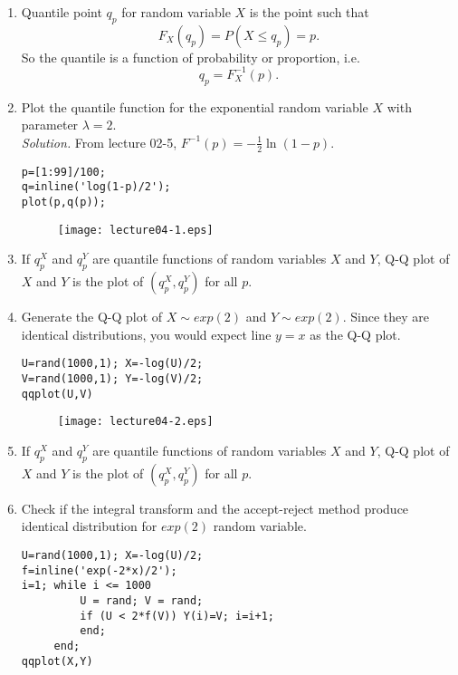 \documentclass[11pt,twocolumn]{article} %
\begin{document}
\begin{enumerate}
\item Quantile point $q_p$ for random variable $X$ is the point
such that $$F_X(q_p)=P(X \leq q_p) = p.$$ So the quantile is a
function of probability or proportion, i.e.
$$q_p = F_X^{-1}(p).$$

\item Plot the quantile function for the exponential random
variable $X$ with parameter $\lambda = 2$.\\
{\em Solution.} From lecture 02-5, $F^{-1}(p) =
-\frac{1}{2}\ln(1-p)$.
\begin{verbatim}
p=[1:99]/100; 
q=inline('log(1-p)/2');
plot(p,q(p));
\end{verbatim}

\begin{figure}
\centering
\renewcommand{\baselinestretch}{1}
\texttt{[image: lecture04-1.eps]}
\end{figure}
 \item If $q_p^X$ and $q_p^Y$ are quantile functions of random
 variables $X$ and $Y$, Q-Q plot of $X$ and $Y$ is the plot of
 $(q_p^X,q_p^Y)$ for all $p$.

\item Generate the Q-Q plot of $X \sim exp(2)$ and $Y \sim
exp(2)$. Since they are identical distributions, you would expect
line $y=x$ as the Q-Q plot.

\begin{verbatim}
U=rand(1000,1); X=-log(U)/2; 
V=rand(1000,1); Y=-log(V)/2;
qqplot(U,V)
\end{verbatim}

\begin{figure}
\centering
\renewcommand{\baselinestretch}{1}
\texttt{[image: lecture04-2.eps]}
\end{figure}

 \item If $q_p^X$ and $q_p^Y$ are quantile functions of random
 variables $X$ and $Y$, Q-Q plot of $X$ and $Y$ is the plot of
 $(q_p^X,q_p^Y)$ for all $p$.

\item Check if the integral transform and the accept-reject method
produce identical distribution for $exp(2)$ random variable.

\begin{verbatim}
U=rand(1000,1); X=-log(U)/2;
f=inline('exp(-2*x)/2'); 
i=1; while i <= 1000 
         U = rand; V = rand;
         if (U < 2*f(V)) Y(i)=V; i=i+1; 
         end; 
     end;
qqplot(X,Y)
\end{verbatim}


\end{enumerate}
\end{document}
